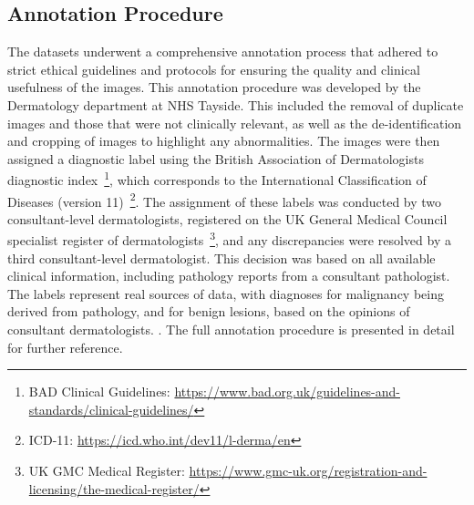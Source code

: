 \subsection{Annotation Procedure}
\label{subsec:annotation_procedure}
The datasets underwent a comprehensive annotation process that adhered to strict ethical guidelines and protocols for ensuring the quality and clinical usefulness of the images. This annotation procedure was developed by the Dermatology department at NHS Tayside. This included the removal of duplicate images and those that were not clinically relevant, as well as the de-identification and cropping of images to highlight any abnormalities. The images were then assigned a diagnostic label using the British Association of Dermatologists diagnostic index~\footnote{BAD Clinical Guidelines: \url{https://www.bad.org.uk/guidelines-and-standards/clinical-guidelines/}}, which corresponds to the International Classification of Diseases (version 11)~\footnote{ICD-11: \url{https://icd.who.int/dev11/l-derma/en}}. The assignment of these labels was conducted by two consultant-level dermatologists, registered on the UK General Medical Council specialist register of dermatologists~\footnote{UK GMC Medical Register: \url{https://www.gmc-uk.org/registration-and-licensing/the-medical-register/}}, and any discrepancies were resolved by a third consultant-level dermatologist. This decision was based on all available clinical information, including pathology reports from a consultant pathologist. The labels represent real sources of data, with diagnoses for malignancy being derived from pathology, and for benign lesions, based on the opinions of consultant dermatologists. . The full annotation procedure is presented in detail for further reference.

